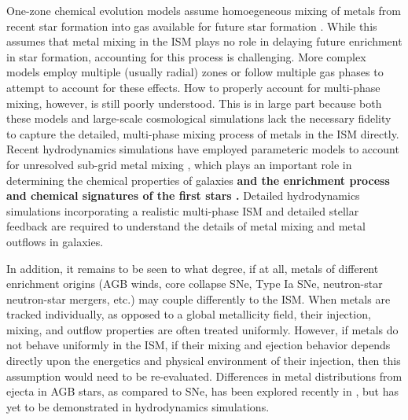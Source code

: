 \documentclass[twocolumn]{aastex61}
\begin{document}
One-zone chemical evolution models assume homoegeneous mixing of metals from recent star formation into gas available for future star formation \citep[e.g.][]{Lanfranchi2006b,Kirby2011-III,Cote2017,Andrews2017}. While this assumes that metal mixing in the ISM plays no role in delaying future enrichment in star formation, accounting for this process is challenging. More complex models \citep[e.g.][]{SchonrichBinney2009,Pezzulli2016} employ multiple (usually radial) zones or follow multiple gas phases to attempt to account for these effects. How to properly account for multi-phase mixing, however, is still poorly understood. This is in large part because both these models and large-scale cosmological simulations lack the necessary fidelity to capture the detailed, multi-phase mixing process of metals in the ISM directly. 
Recent hydrodynamics simulations have employed parameteric models to account for unresolved sub-grid metal mixing \citep{PanScannapiecoScalo2013,Sarmento2017}, which plays an important role in determining the chemical properties of galaxies \citep[e.g.][]{Shen2010, Pilkington2012, Few2012, Brook2014, FengKrumholz2014, Escala2018, Armillotta2018} 
\textbf{and the enrichment process and chemical signatures of the first stars \citep[e.g.][]{Jeon2015,Ritter2015,Smith2015}.} Detailed hydrodynamics simulations incorporating a realistic multi-phase ISM and detailed stellar feedback are required to understand the details of metal mixing and metal outflows in galaxies.

In addition, it remains to be seen to what degree, if at all, metals of different enrichment origins (AGB winds, core collapse SNe, Type Ia SNe, neutron-star neutron-star mergers, etc.) may couple differently to the ISM. When metals are tracked individually, as opposed to a global metallicity field, their injection, mixing, and outflow properties are often treated uniformly. However, if metals do not behave uniformly in the ISM, if their mixing and ejection behavior depends directly upon the energetics and physical environment of their injection, then this assumption would need to be re-evaluated. Differences in metal distributions from ejecta in AGB stars, as compared to SNe, has been explored recently in \cite{KrumholzTing2018}, but has yet to be demonstrated in hydrodynamics simulations.
\end{document}
